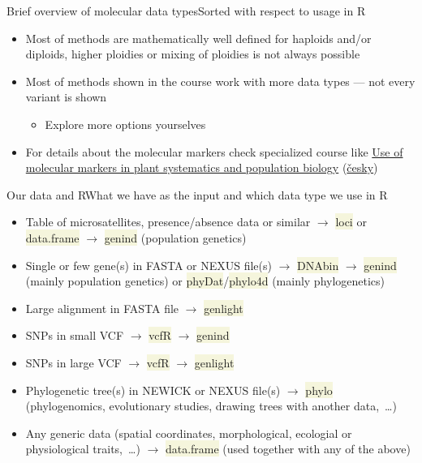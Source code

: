 \documentclass[compress, xelatex, 11pt, xcolor=svgnames, aspectratio=169, url={hyphens, lowtilde}]{beamer}
\renewcommand{\texttt}[1]{\colorbox{Beige}{{\ttfamily #1}}}
\begin{document}
\begin{frame}[allowframebreaks]{Brief overview of molecular data types}{Sorted with respect to usage in R}
\begin{itemize}
\begin{itemize}
		\end{itemize}
		\item Most of methods are mathematically well defined for haploids and/or diploids, higher ploidies or mixing of ploidies is not always possible
		\item Most of methods shown in the course work with more data types --- not every variant is shown
		\begin{itemize}
			\item Explore more options yourselves
		\end{itemize}
		\item For details about the molecular markers check specialized course like \href{https://is.cuni.cz/studium/eng/predmety/index.php?do=predmet&kod=MB120P44}{Use of molecular markers in plant systematics and population biology} (\href{https://is.cuni.cz/studium/predmety/index.php?do=predmet&kod=MB120P44}{česky})
	\end{itemize}
\end{frame}

\begin{frame}{Our data and R}{What we have as the input and which data type we use in R}
	\begin{itemize}
		\item Table of microsatellites, presence/absence data or similar $\rightarrow$ \texttt{loci} or \texttt{data.frame} $\rightarrow$ \texttt{genind} (population genetics)
		\item Single or few gene(s) in FASTA or NEXUS file(s) $\rightarrow$ \texttt{DNAbin} $\rightarrow$ \texttt{genind} (mainly population genetics) or \texttt{phyDat}/\texttt{phylo4d} (mainly phylogenetics)
		\item Large alignment in FASTA file $\rightarrow$ \texttt{genlight}
		\item SNPs in small VCF $\rightarrow$ \texttt{vcfR} $\rightarrow$ \texttt{genind}
		\item SNPs in large VCF $\rightarrow$ \texttt{vcfR} $\rightarrow$ \texttt{genlight}
		\item Phylogenetic tree(s) in NEWICK or NEXUS file(s) $\rightarrow$ \texttt{phylo} (phylogenomics, evolutionary studies, drawing trees with another data,~\ldots)
		\item Any generic data (spatial coordinates, morphological, ecologial or physiological traits,~\ldots) $\rightarrow$ \texttt{data.frame} (used together with any  of the above)
	\end{itemize}
\end{frame}
\end{document}
